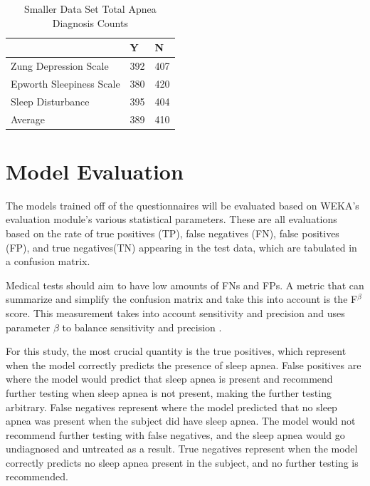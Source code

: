 \documentclass[10pt,conference,a4paper]{IEEEtran}
\begin{document}
\begin{table}[h]
\centering
\begin{tabular}{@{}lll@{}}
\toprule
                         & Y   & N   \\ \midrule
Zung Depression Scale    & 392 & 407 \\
Epworth Sleepiness Scale & 380 & 420 \\
Sleep Disturbance        & 395 & 404 \\ \midrule
Average                  & 389 & 410 \\ \bottomrule
\end{tabular}
\caption{Smaller Data Set Total Apnea Diagnosis Counts}
\label{smallApneaCounts}
\end{table}



\section{Model Evaluation}
\label{evaluate}

The models trained off of the questionnaires will be evaluated based on WEKA's evaluation module's various statistical parameters. These are all evaluations based on the rate of true positives (TP), false negatives (FN), false positives (FP), and true negatives(TN) appearing in the test data, which are tabulated in a confusion matrix. 

Medical tests should aim to have low amounts of FNs and FPs. A metric that can summarize and simplify the confusion matrix and take this into account is the F$^\beta$ score. This measurement takes into account sensitivity and precision and uses parameter $\beta$ to balance sensitivity and precision \cite{Lever2016}. 

For this study, the most crucial quantity is the true positives, which represent when the model correctly predicts the presence of sleep apnea. False positives are where the model would predict that sleep apnea is present and recommend further testing when sleep apnea is not present, making the further testing arbitrary. False negatives represent where the model predicted that no sleep apnea was present when the subject did have sleep apnea. The model would not recommend further testing with false negatives, and the sleep apnea would go undiagnosed and untreated as a result. True negatives represent when the model correctly predicts no sleep apnea present in the subject, and no further testing is recommended.
\end{document}
